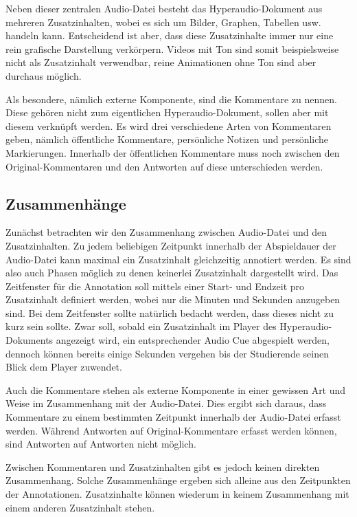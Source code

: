 Neben dieser zentralen Audio-Datei besteht das Hyperaudio-Dokument aus mehreren Zusatzinhalten, wobei es sich um Bilder, Graphen, Tabellen usw. handeln kann. Entscheidend ist aber, dass diese Zusatzinhalte immer nur eine rein grafische Darstellung verkörpern. Videos mit Ton sind somit beispielsweise nicht als Zusatzinhalt verwendbar, reine Animationen ohne Ton sind aber durchaus möglich.

Als besondere, nämlich externe Komponente, sind die Kommentare zu nennen. Diese gehören nicht zum eigentlichen Hyperaudio-Dokument, sollen aber mit diesem verknüpft werden. Es wird drei verschiedene Arten von Kommentaren geben, nämlich  öffentliche Kommentare, persönliche Notizen und persönliche Markierungen.  Innerhalb der öffentlichen Kommentare muss noch zwischen den Original-Kommentaren und den Antworten auf diese unterschieden werden. 


\subsection{Zusammenhänge}
Zunächst betrachten wir den Zusammenhang zwischen Audio-Datei und den Zusatzinhalten. Zu jedem beliebigen Zeitpunkt innerhalb der Abspieldauer der Audio-Datei kann maximal ein Zusatzinhalt gleichzeitig annotiert werden. Es sind also auch Phasen möglich zu denen keinerlei Zusatzinhalt dargestellt wird. Das Zeitfenster für die Annotation soll mittels einer Start- und Endzeit pro Zusatzinhalt definiert werden, wobei nur die Minuten und Sekunden anzugeben sind. Bei dem Zeitfenster sollte natürlich bedacht werden, dass dieses nicht zu kurz sein sollte. Zwar soll, sobald ein Zusatzinhalt im Player des Hyperaudio-Dokuments angezeigt wird,  ein entsprechender Audio Cue abgespielt werden, dennoch können bereits einige Sekunden vergehen bis der Studierende seinen Blick dem Player zuwendet.

Auch die Kommentare stehen als externe Komponente in einer gewissen Art und Weise im Zusammenhang mit der Audio-Datei. Dies ergibt sich daraus, dass Kommentare zu einem bestimmten Zeitpunkt innerhalb der Audio-Datei erfasst werden. Während Antworten auf Original-Kommentare erfasst werden können, sind Antworten auf Antworten nicht möglich.

Zwischen Kommentaren und Zusatzinhalten gibt es jedoch keinen direkten Zusammenhang. Solche Zusammenhänge ergeben sich alleine aus den Zeitpunkten der Annotationen. Zusatzinhalte können wiederum in keinem Zusammenhang mit einem anderen Zusatzinhalt stehen.


